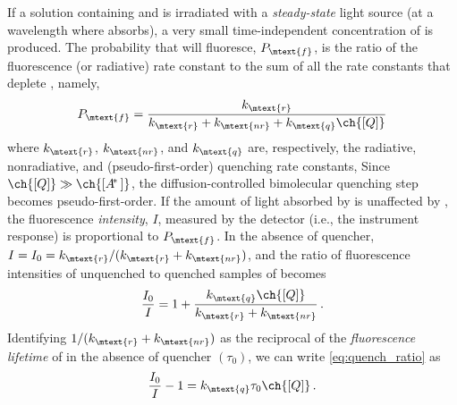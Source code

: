 If a solution containing  and  is irradiated with a \emph{steady-state} light source (at a wavelength where  absorbs), a very small time-independent concentration of  is produced. 
The probability that  will fluoresce, \( P_\mtext{f} \), is the ratio of the fluorescence (or radiative) rate constant to the sum of all the rate constants that deplete , namely,
\begin{equation}
	P_\mtext{f} = \frac{k_\mtext{r}}{k_\mtext{r} + k_\mtext{nr} + k_\mtext{q} \ch{[Q]}}
	\label{eq:prob_fluor}
\end{equation}
where \( k_\mtext{r} \), \( k_\mtext{nr} \), and \( k_\mtext{q} \)\ch{[Q]} are, respectively, the radiative, nonradiative, and (pseudo-first-order) quenching rate constants, 
Since \( \ch{[Q]} \gg \ch{[A\!^*\,]}\), the diffusion-controlled bimolecular quenching step becomes pseudo-first-order. 
If the amount of light absorbed by  is unaffected by \ch{[Q]}, the fluorescence \emph{intensity}, \( I \), measured by the detector (i.e., the instrument response) is proportional to \( P_\mtext{f} \). 
In the absence of quencher, \( I = I_0 = k_\mtext{r} / (k_\mtext{r} + k_\mtext{nr}) \), and the ratio of fluorescence intensities of unquenched to quenched samples of  becomes 
\begin{equation}
	\frac{I_0}{I} = 1 + \frac{k_\mtext{q} \ch{[Q]}}{k_\mtext{r} + k_\mtext{nr}} \, .
	\label{eq:quench_ratio}
\end{equation}
Identifying \( 1/(k_\mtext{r} + k_\mtext{nr}) \) as the reciprocal of the \emph{fluorescence lifetime} of  in the absence of quencher \( (\tau_0) \), we can write \cref{eq:quench_ratio} as 
\begin{equation}
	\frac{I_0}{I} - 1 = k_\mtext{q} \tau_0 \ch{[Q]} \, .
	\label{eq:sv_rel}
\end{equation}

